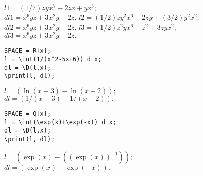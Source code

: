 {
$l1 = (1/7)zyx^7-2zx+yx^3; $\\
\hspace*{4mm} $dl1 = x^6yz + 3x^2y - 2z. $
$l2 = (1/2)zy^2x^6-2zy+(3/2)y^2x^2; $\\
\hspace*{4mm} $dl2 = x^6yz + 3x^2y - 2z.$
$l3 = (1/2)z^2yx^6-z^2+3zyx^2; $\\
\hspace*{4mm} $dl3 = x^6yz + 3x^2y - 2z.$
}


\begin{verbatim}
SPACE = R[x];
l = \int(1/(x^2-5x+6)) d x;
dl = \D(l,x);
\print(l, dl);
\end{verbatim}
\vspace*{-3mm}

{
$l = (\ln(x-3)-\ln(x-2)); $\\
\hspace*{4mm} $dl = (1/(x-3)-1/(x-2)). $
}

\begin{verbatim}
SPACE = Q[x];
l = \int(\exp(x)+\exp(-x)) d x;
dl = \D(l,x);
\print(l, dl);
\end{verbatim}
\vspace*{-3mm}

{
$l = (\exp(x)-((\exp(x))^{-1})); $\\
\hspace*{4mm} $dl = (\exp(x)+\exp(-x)). $
}

